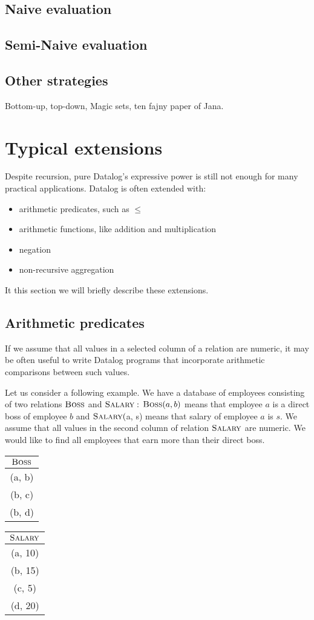\documentclass{pracamgr}
\theoremstyle{plain}
\theoremstyle{definition}
\theoremstyle{remark}
\newcommand{\relat}[2]{$\textsc{#1}#2$}
\begin{document}
\subsection{Naive evaluation}
\subsection{Semi-Naive evaluation}
\subsection{Other strategies}
Bottom-up, top-down, Magic sets, ten fajny paper of Jana.

\section{Typical extensions}
Despite recursion, pure Datalog's expressive power is still not enough for many practical applications. Datalog is often extended with:
\begin{itemize}
\item arithmetic predicates, such as $\le$
\item arithmetic functions, like addition and multiplication
\item negation
\item non-recursive aggregation
\end{itemize}

It this section we will briefly describe these extensions.

\subsection{Arithmetic predicates}
If we assume that all values in a selected column of a relation are numeric, it may be often useful to write Datalog programs that incorporate arithmetic comparisons between such values.

Let us consider a following example. We have a database of employees consisting of two relations \relat{Boss}{} and \relat{Salary}: \relat{Boss}{(a, b)} means that employee $a$ is a direct boss of employee $b$ and \relat{Salary}(a, s) means that salary of employee $a$ is $s$. We assume that all values in the second column of relation \relat{Salary}{} are numeric. We would like to find all employees that earn more than their direct boss.

\begin{center}
\begin{tabular}{|c|}
\hline
\relat{Boss}{} \\
\hline
(a, b)\\
(b, c)\\
(b, d)\\
\hline
\end{tabular}
\quad
\begin{tabular}{|c|}
\hline
\relat{Salary}{} \\
\hline
(a, 10)\\
(b, 15)\\
(c, 5)\\
(d, 20)\\
\hline
\end{tabular}
\end{center}
\end{document}
